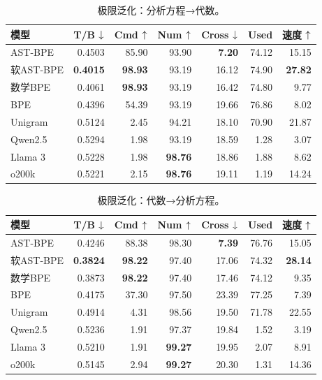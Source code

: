 \begin{table}[H]
\centering\small\renewcommand{\arraystretch}{1.05}
\caption{极限泛化：分析方程→代数。}\label{tab:detail7}
\begin{tabular}{lrrrrrr}\toprule
模型&T/B $\downarrow$&Cmd $\uparrow$&Num $\uparrow$&Cross $\downarrow$&Used&速度 $\uparrow$\\\midrule
AST-BPE & 0.4503 & 85.90 & 93.90 & \textbf{7.20} & 74.12 & 15.15 \\
软AST-BPE & \textbf{0.4015} & \textbf{98.93} & 93.19 & 16.12 & 74.90 & \textbf{27.82} \\
数学BPE & 0.4061 & \textbf{98.93} & 93.19 & 16.42 & 74.80 & 9.77 \\
BPE & 0.4396 & 54.39 & 93.19 & 19.66 & 76.86 & 8.02 \\
Unigram & 0.5124 & 2.45 & 94.21 & 18.10 & 70.90 & 21.87 \\
\midrule
Qwen2.5 & 0.5294 & 1.98 & 93.19 & 18.59 & 1.28 & 3.07 \\
Llama 3 & 0.5228 & 1.98 & \textbf{98.76} & 18.86 & 1.88 & 8.62 \\
o200k & 0.5221 & 2.15 & \textbf{98.76} & 19.11 & 1.19 & 14.24 \\
\bottomrule\end{tabular}
\end{table}

\begin{table}[H]
\centering\small\renewcommand{\arraystretch}{1.05}
\caption{极限泛化：代数→分析方程。}\label{tab:detail8}
\begin{tabular}{lrrrrrr}\toprule
模型&T/B $\downarrow$&Cmd $\uparrow$&Num $\uparrow$&Cross $\downarrow$&Used&速度 $\uparrow$\\\midrule
AST-BPE & 0.4246 & 88.38 & 98.30 & \textbf{7.39} & 76.76 & 15.05 \\
软AST-BPE & \textbf{0.3824} & \textbf{98.22} & 97.40 & 17.06 & 74.32 & \textbf{28.14} \\
数学BPE & 0.3873 & \textbf{98.22} & 97.40 & 17.46 & 74.12 & 9.35 \\
BPE & 0.4175 & 37.30 & 97.50 & 23.39 & 77.25 & 7.39 \\
Unigram & 0.4914 & 4.31 & 98.56 & 19.50 & 71.78 & 22.55 \\
\midrule
Qwen2.5 & 0.5236 & 1.91 & 97.37 & 19.84 & 1.52 & 3.19 \\
Llama 3 & 0.5210 & 1.91 & \textbf{99.27} & 19.95 & 2.07 & 8.91 \\
o200k & 0.5145 & 2.94 & \textbf{99.27} & 20.30 & 1.31 & 14.36 \\
\bottomrule\end{tabular}
\end{table}


